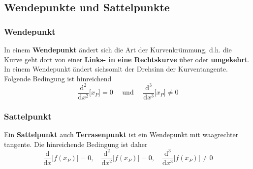 \subsection{Wendepunkte und Sattelpunkte}
\subsubsection{Wendepunkt}
In einem \textbf{Wendepunkt} ändert sich die Art der Kurvenkrümmung, d.h. die Kurve geht dort von einer \textbf{Links- in eine Rechtskurve} über oder \textbf{umgekehrt}. In einem Wendepunkt ändert sichsomit der Drehsinn der Kurventangente. Folgende Bedingung ist hinreichend
\begin{equation} 
\boxed{\dfrac{\text{d}^2}{\text{d}x^2}\Big[x_P\Big]=0\quad \text{ und }\quad \dfrac{\text{d}^3}{\text{d}x^3}\Big[x_P\Big]\neq 0}
\end{equation} 
\subsubsection{Sattelpunkt}
Ein \textbf{Sattelpunkt} auch \textbf{Terrasenpunkt} ist ein Wendepunkt mit waagrechter tangente. Die hinreichende Bedingung ist daher
\begin{equation}
\boxed{\dfrac{\text{d}}{\text{d}x}\Big[f\left(x_P\right)\Big]=0,\quad \dfrac{\text{d}^2}{\text{d}x^2}\Big[f\left(x_P\right)\Big]=0,\quad \dfrac{\text{d}^3}{\text{d}x^3}\Big[f\left(x_P\right)\Big]\neq 0}
\end{equation}